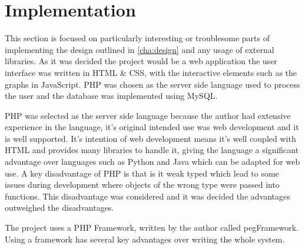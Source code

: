 \chapter{Implementation}

\begin{comment}
Chapter 4: Implementation
The implementation details should be confined to the important, difficult or interesting aspects. Large chunks of code should be avoided, and diagrams and tables should be used to present details clearly.
\end{comment}


\begin{comment}
Statement Management 
Upload
NamedEntityResolution
Suggestions ........................ 19

Prediction
MarkovChain
WeightedArithmeticMean
FiveModelSystem
Confidence

Security Considerations
AccountHijacking
PasswordSecurity
Database Security
Other
\end{comment}

This section is focused on particularly interesting or troublesome parts of implementing the design outlined in \ref{cha:design} and any usage of external libraries. As it was decided the project would be a web application the user interface was written in HTML \& CSS, with the interactive elements such as the graphs in JavaScript. PHP was chosen as the server side language used to process the user and the database was implemented using MySQL.

PHP was selected as the server side language because the author had extensive experience in the language, it's original intended use was web development and it is well supported. It's intention of web development means it's well coupled with HTML and provides many libraries to handle it, giving the language a significant advantage over languages such as Python and Java which can be adapted for web use. A key disadvantage of PHP is that is it weak typed which lead to some issues during development where objects of the wrong type were passed into functions. This disadvantage was considered and it was decided the advantages outweighed the disadvantages.

The project uses a PHP Framework, written by the author  called pegFramework. Using a framework has several key advantages over writing the whole system.

